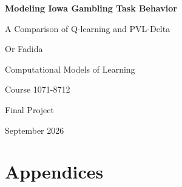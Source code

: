 \documentclass[11pt,a4paper]{article}
\begin{document}
\begin{titlepage}
    \centering
    \vspace*{3.2cm}
    {\LARGE\bfseries Modeling Iowa Gambling Task Behavior\par}
    \vspace{0.5cm}
    {\Large A Comparison of Q-learning and PVL-Delta\par}

    \vspace{2.2cm}

    {\large Or Fadida\par}
    \vspace{0.35cm}
    {\large Computational Models of Learning\par}
    \vspace{0.15cm}
    {\large Course 1071-8712\par} %
    \vspace{0.35cm}
    {\large Final Project\par}

    \vfill

    {\large September 2026\par}
\end{titlepage}

\setcounter{tocdepth}{1}
\tableofcontents
\clearpage


















\clearpage
{} %



\clearpage
\appendix
\part*{Appendices}



\end{document}
